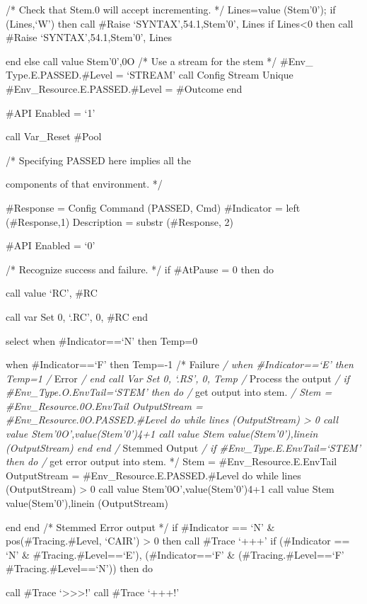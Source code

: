 /* Check that Stem.0 will accept incrementing. */ Lines=value (Stem'0');
if \datatype(Lines,`W') then call \#Raise `SYNTAX',54.1,Stem'0', Lines
if Lines\textless0 then call \#Raise `SYNTAX',54.1,Stem'0', Lines

end else call value Stem'0',0O /* Use a stream for the stem */ \#Env\_
Type.E.PASSED.\#Level = `STREAM' call Config Stream Unique
\#Env\_Resource.E.PASSED.\#Level = \#Outcome end

\#API Enabled = `1'

call Var\_Reset \#Pool

/* Specifying PASSED here implies all the

components of that environment. */

\#Response = Config Command (PASSED, Cmd) \#Indicator = left
(\#Response,1) Description = substr (\#Response, 2)

\#API Enabled = `0'

/* Recognize success and failure. */ if \#AtPause = 0 then do

call value `RC', \#RC

call var Set 0, `.RC', 0, \#RC end

select when \#Indicator==`N' then Temp=0

when \#Indicator==`F' then Temp=-1 /* Failure \emph{/ when
\#Indicator==`E' then Temp=1 /} Error \emph{/ end call Var Set 0, `.RS',
0, Temp /} Process the output \emph{/ if \#Env\_Type.O.EnvTail=`STEM'
then do /} get output into stem. \emph{/ Stem =
\#Env\_Resource.0O.EnvTail OutputStream =
\#Env\_Resource.0O.PASSED.\#Level do while lines (OutputStream)
\textgreater{} 0 call value Stem'0O',value(Stem'0')4+1 call value
Stem\textbar{} \textbar value(Stem'0'),linein (OutputStream) end end /}
Stemmed Output \emph{/ if \#Env\_Type.E.EnvTail=`STEM' then do /} get
error output into stem. */ Stem = \#Env\_Resource.E.EnvTail OutputStream
= \#Env\_Resource.E.PASSED.\#Level do while lines (OutputStream)
\textgreater{} 0 call value Stem'0O',value(Stem'0')4+1 call value
Stem\textbar{} \textbar value(Stem'0'),linein (OutputStream)

end end /* Stemmed Error output */ if \#Indicator == `N' \&
pos(\#Tracing.\#Level, `CAIR') \textgreater{} 0 then call \#Trace `+++'
if (\#Indicator == `N' \& \#Tracing.\#Level==`E'), \textbar{}
(\#Indicator==`F' \& (\#Tracing.\#Level==`F' \textbar{}
\#Tracing.\#Level==`N')) then do

call \#Trace `\textgreater\textgreater\textgreater!' call \#Trace `+++!'

